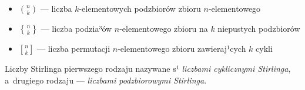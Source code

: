 \documentclass[a4paper,10pt]{beamer}
\begin{document}
\begin{frame}

\begin{itemize}
\item ${n\choose k}$ --- liczba $k$-elementowych podzbiorów zbioru $n$-elementowego
\item ${n\brace k}$ --- liczba podzia³ów $n$-elementowego zbioru na $k$ niepustych podzbiorów
\item ${n\brack k}$ --- liczba permutacji $n$-elementowego zbioru zawieraj¹cych $k$ cykli
\end{itemize}

\bigskip

\begin{block}{}
Liczby Stirlinga pierwszego rodzaju nazywane s¹ {\it liczbami cyklicznymi Stirlinga}, a~drugiego rodzaju --- {\it liczbami podzbiorowymi Stirlinga}.
\end{block}


\end{frame}
\end{document}
